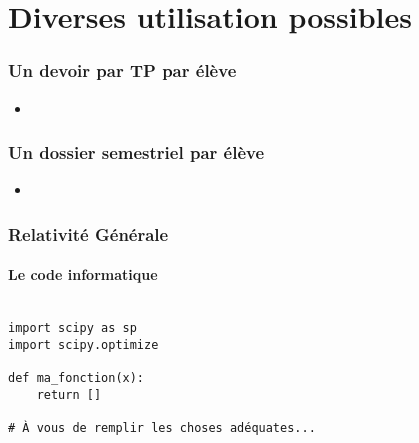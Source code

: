 \section{Diverses utilisation possibles}


\begin{frame}
\frametitle{Un devoir par TP par élève}

\begin{itemize}
	\item	<1->
\end{itemize}

\end{frame}


\begin{frame}
\frametitle{Un dossier semestriel par élève}

\begin{itemize}
	\item	<1->
\end{itemize}

\end{frame}


\begin{frame}[fragile]
\frametitle{Relativité Générale}
\framesubtitle{Le code informatique}

\begin{code}
\begin{verbatim}

import scipy as sp
import scipy.optimize

def ma_fonction(x):
    return []

# À vous de remplir les choses adéquates...

\end{verbatim}
\end{code}
\end{frame}
